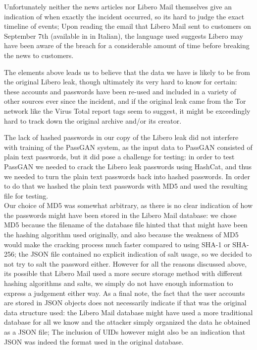 Unfortunately neither the news articles nor Libero Mail themselves give an indication of when exactly the incident occurred, so its hard to judge the exact timeline of events; Upon reading the email that Libero Mail sent to customers on September 7th (available in \cite{libero-news-fanpage} in Italian), the language used suggests Libero may have been aware of the breach for a considerable amount of time before breaking the news to customers.

The elements above leads us to believe that the data we have is likely to be from the original Libero leak, though ultimately its very hard to know for certain: these accounts and passwords have been re-used and included in a variety of other sources ever since the incident, and if the original leak came from the Tor network like the Virus Total report tags seem to suggest, it might be exceedingly hard to track down the original archive and/or its creator.

The lack of hashed passwords in our copy of the Libero leak did not interfere with training of the PassGAN system, as the input data to PassGAN consisted of plain text passwords, but it did pose a challenge for testing: in order to test PassGAN we needed to crack the Libero leak passwords using HashCat, and thus we needed to turn the plain text passwords back into hashed passwords.
In order to do that we hashed the plain text passwords with MD5 and used the resulting file for testing.\\
Our choice of MD5 was somewhat arbitrary, as there is no clear indication of how the passwords might have been stored in the Libero Mail database: we chose MD5 because the filename of the database file hinted that that might have been the hashing algorithm used originally, and also because the weakness of MD5 would make the cracking process much faster compared to using SHA-1 or SHA-256; the JSON file contained no explicit indication of salt usage, so we decided to not try to salt the password either. 
However for all the reasons discussed above, its possible that Libero Mail used a more secure storage method with different hashing algorithms and salts, we simply do not have enough information to express a judgement either way.
As a final note, the fact that the user accounts are stored in JSON objects does not necessarily indicate if that was the original data structure used: the Libero Mail database might have used a more traditional database for all we know and the attacker simply organized the data he obtained as a JSON file; The inclusion of UIDs however might also be an indication that JSON was indeed the format used in the original database.

